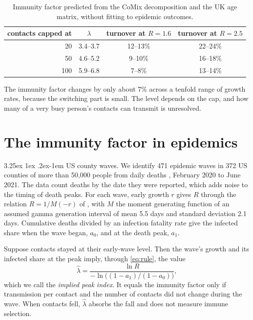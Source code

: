 \documentclass[11pt]{article}
\makeatletter
\renewcommand\paragraph{\@startsection{paragraph}{4}{\z@}%
  {3.25ex \@plus1ex \@minus.2ex}{-1em}%
  {\normalfont\normalsize\itshape}}
\theoremstyle{remark}
\makeatother
\begin{document}
\begin{table}[h]
\centering
\begin{tabular}{rccc}
\toprule
contacts capped at & $\lambda$ & turnover at $R = 1.6$ & turnover at $R = 2.5$ \\
\midrule
20 & 3.4--3.7 & 12--13\% & 22--24\% \\
50 & 4.6--5.2 & 9--10\% & 16--18\% \\
100 & 5.9--6.8 & 7--8\% & 13--14\% \\
\bottomrule
\end{tabular}
\caption{Immunity factor predicted from the CoMix decomposition and the UK age matrix, without fitting to epidemic outcomes.}\label{tab:predict}
\end{table}

The immunity factor changes by only about 7\% across a tenfold range of growth rates, because the switching part is
small. The level depends on the cap, and how many of a very busy person's contacts can transmit is unresolved.

\section{The immunity factor in epidemics}

\paragraph{US county waves.} We identify 471 epidemic waves in 372 US counties of more than 50,000 people from daily
deaths \citep{nyt2021}, February 2020 to June 2021. The data count deaths by the date they were reported, which adds
noise to the timing of death peaks. For each wave, early growth $r$ gives $R$ through the relation $R = 1/M(-r)$ of
\citet{wallinga2007}, with $M$ the moment generating function of an assumed gamma generation interval of mean 5.5
days and standard deviation 2.1 days. Cumulative deaths divided by an infection fatality rate give the infected share
when the wave began, $a_0$, and at the death peak, $a_1$.

Suppose contacts stayed at their early-wave level. Then the wave's growth and its infected share at the peak imply,
through \eqref{eq:rule}, the value
\begin{equation}
  \hat\lambda = \frac{\ln R}{-\ln\big((1 - a_1)/(1 - a_0)\big)} ,
\end{equation}
which we call the \emph{implied peak index}. It equals the immunity factor only if transmission per contact and the
number of contacts did not change during the wave. When contacts fell, $\hat\lambda$ absorbs the fall and does not
measure immune selection.
\end{document}
